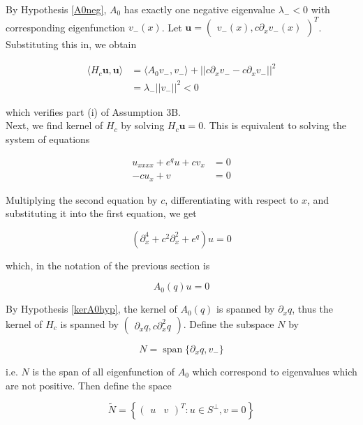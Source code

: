 \documentclass[12pt]{article}
\DeclareMathOperator{\spn}{span}
\begin{document}
By Hypothesis \ref{A0neg}, $A_0$ has exactly one negative eigenvalue $\lambda_- < 0$ with corresponding eigenfunction $v_-(x)$. Let $\textbf{u} = \begin{pmatrix} v_-(x), c \partial_x v_-(x) \end{pmatrix}^T$. Substituting this in, we obtain

\begin{align*}
\langle H_c \textbf{u}, \textbf{u} \rangle &=
\langle A_0 v_-, v_- \rangle + || c \partial_x v_- - c \partial_x v_-||^2 \\
&= \lambda_- ||v_-||^2 < 0
\end{align*}

which verifies part (i) of Assumption 3B.\\

Next, we find kernel of $H_c$ by solving $H_c \textbf{u} = 0$. This is equivalent to solving the system of equations

\begin{align*}
u_{xxxx} + e^q u + c v_x &= 0 \\
-c u_x + v &= 0
\end{align*}

Multiplying the second equation by $c$, differentiating with respect to $x$, and substituting it into the first equation, we get

\begin{equation}
(\partial_x^4 + c^2 \partial_x^2 + e^q)u = 0
\end{equation}

which, in the notation of the previous section is

\begin{equation}
A_0(q) u = 0
\end{equation}

By Hypothesis \ref{kerA0hyp}, the kernel of $A_0(q)$ is spanned by $\partial_x q$, thus the kernel of $H_c$ is spanned by $\begin{pmatrix} \partial_x q, c \partial_x^2 q \end{pmatrix}$. Define the subspace $N$ by

\begin{equation}
N = \spn\{ \partial_x q, v_-\}
\end{equation}

i.e. $N$ is the span of all eigenfunction of $A_0$ which correspond to eigenvalues which are not positive. Then define the space

\begin{equation}
\tilde{N} = \left\{
\begin{pmatrix}u & v\end{pmatrix}^T : u \in S^\perp, v = 0
\right\}
\end{equation}
\end{document}
